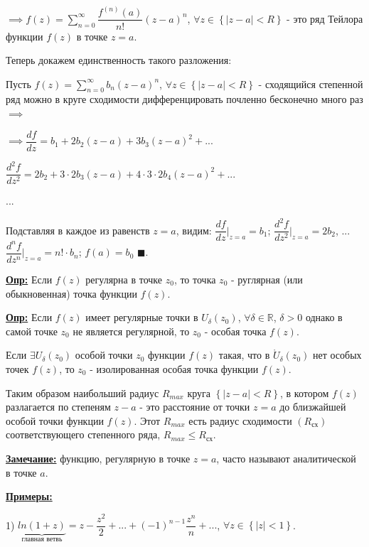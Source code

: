 \documentclass[a4paper, 12pt]{article}
\begin{document}
  \quad $\implies f(z) = \displaystyle\sum\limits_{n=0}^{\infty} \dfrac{f^{(n)} (a)}{n!} (z-a)^n$, $\forall z \in \left\{ |z-a| < R \right\}$ - это ряд Тейлора функции $f(z)$ в точке $z = a$.

  \quad Теперь докажем единственность такого разложения:

  \quad Пусть $f(z) = \displaystyle\sum\limits_{n=0}^{\infty} b_n (z-a)^n$, $\forall z \in \left\{ |z-a| < R \right\}$ - сходящийся степенной ряд можно в круге  сходимости дифференцировать почленно бесконечно много раз $\implies$

  \begin{center}
    $\implies \dfrac{df}{dz} = b_1 + 2b_2(z-a) + 3 b_3(z-a)^2 + ...$

    $\dfrac{d^2 f}{dz^2} = 2b_2 + 3 \cdot 2 b_3 (z-a) + 4\cdot3\cdot2 b_4(z-a)^2 + ...$

    $...$
  \end{center}

  \quad Подставляя в каждое из равенств $z = a$, видим: $\dfrac{df}{dz} \bigg|_{z=a} = b_1$; $\dfrac{d^2f}{dz^2} \bigg|_{z=a} = 2b_2$, ... $\dfrac{d^n f}{dz^n} \bigg|_{z = a} =  n! \cdot b_n$; $f(a) = b_0$ $\blacksquare$.
  
  \quad \textbf{\underline{Опр:}} Если $f(z)$ регулярна в точке $z_0$, то точка $z_0$ - руглярная (или обыкновенная) точка функции $f(z)$. 

  \quad \textbf{\underline{Опр:}} Если $f(z)$ имеет регулярные точки в $ U_{\delta}(z_0)$, $\forall \delta \in \mathbb{R}$, $\delta > 0$ однако в самой точке $z_0$ не является регулярной, то $z_0$ - особая точка $f(z)$.

  \quad Если $\exists U_{\delta}(z_0)$ особой точки $z_0$ функции $f(z)$ такая, что в $\mathring{U}_\delta(z_0)$ нет особых точек $f(z)$, то $z_0$ - изолированная особая точка функции $f(z)$.

  \quad Таким образом наибольший радиус $R_{max}$ круга $\left\{ |z - a| < R\right\}$, в котором $f(z)$ разлагается по степеням $z-a$ - это расстояние от точки $z=a$ до близжайшей особой точки функции $f(z)$. Этот $R_{max}$ есть радиус сходимости $(R_{\text{сх}})$ соответствующего степенного ряда, $R_{max} \leq R_{\text{сх}}$.

  \quad \textbf{\underline{Замечание:}} функцию, регулярную в точке $z = a$, часто называют аналитической в точке $a$.

  \quad \textbf{\underline{Примеры:}} 

  1) $ \underbrace{ln(1 + z)}_{\text{главная ветвь}} = z - \dfrac{z^2}{2} + ... + (-1)^{n-1} \dfrac{z^n}{n} + ...$, $\forall z \in \left\{ |z| < 1 \right\}$.
\end{document}
